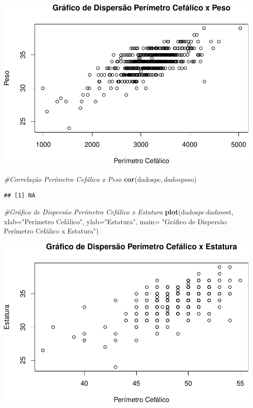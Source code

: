 \documentclass[11pt,]{article}
\makeatletter
\newenvironment{Shaded}{\begin{snugshade}}{\end{snugshade}}
\newcommand{\KeywordTok}[1]{\textcolor[rgb]{0.13,0.29,0.53}{\textbf{{#1}}}}
\newcommand{\DataTypeTok}[1]{\textcolor[rgb]{0.13,0.29,0.53}{{#1}}}
\newcommand{\StringTok}[1]{\textcolor[rgb]{0.31,0.60,0.02}{{#1}}}
\newcommand{\CommentTok}[1]{\textcolor[rgb]{0.56,0.35,0.01}{\textit{{#1}}}}
\newcommand{\NormalTok}[1]{{#1}}
\def\maxwidth{\ifdim\Gin@nat@width>\linewidth\linewidth
\else\Gin@nat@width\fi}
\let\Oldincludegraphics\includegraphics
\renewcommand{\includegraphics}[1]{\Oldincludegraphics[width=\maxwidth]{#1}}
\makeatother
\begin{document}
\includegraphics{versaofinal_lista3_files/figure-latex/unnamed-chunk-9-1.pdf}

\begin{Shaded}
\begin{Highlighting}[]
\CommentTok{#Correlação Perímetro Cefálico x Peso}
\KeywordTok{cor}\NormalTok{(dados$pc,dados$peso)}
\end{Highlighting}
\end{Shaded}

\begin{verbatim}
## [1] NA
\end{verbatim}

\begin{Shaded}
\begin{Highlighting}[]
\CommentTok{#Gráfico de Dispersão Perímetro Cefálico x Estatura}
\KeywordTok{plot}\NormalTok{(dados$pc~dados$est, }\DataTypeTok{xlab=}\StringTok{"Perímetro Cefálico"}\NormalTok{, }\DataTypeTok{ylab=}\StringTok{"Estatura"}\NormalTok{,}
     \DataTypeTok{main=} \StringTok{"Gráfico de Dispersão Perímetro Cefálico x Estatura"}\NormalTok{)}
\end{Highlighting}
\end{Shaded}

\includegraphics{versaofinal_lista3_files/figure-latex/unnamed-chunk-9-2.pdf}
\end{document}
